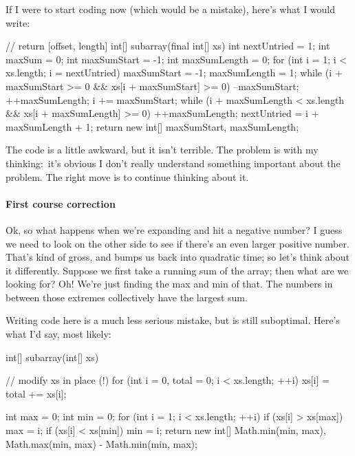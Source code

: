 \documentclass{article}
\begin{document}
        If I were to start coding now (which would be a mistake), here's what I
        would write:

\begin{javacode}
// return [offset, length]
int[] subarray(final int[] xs) {
  int nextUntried  = 1;
  int maxSum       = 0;
  int maxSumStart  = -1;
  int maxSumLength = 0;
  for (int i = 1; i < xs.length; i = nextUntried) {
    maxSumStart  = -1;
    maxSumLength = 1;
    while (i + maxSumStart >= 0 && xs[i + maxSumStart] >= 0) {
      --maxSumStart;
      ++maxSumLength;
    }
    i += maxSumStart;
    while (i + maxSumLength < xs.length
           && xs[i + maxSumLength] >= 0)
      ++maxSumLength;
    nextUntried = i + maxSumLength + 1;
  }
  return new int[] {maxSumStart, maxSumLength};
} \end{javacode}

        The code is a little awkward, but it isn't terrible. The problem is
        with my thinking:~it's obvious I don't really understand something
        important about the problem. The right move is to continue thinking
        about it.

\paragraph{First course correction}
        Ok, so what happens when we're expanding and hit a negative number? I
        guess we need to look on the other side to see if there's an even
        larger positive number. That's kind of gross, and bumps us back into
        quadratic time; so let's think about it differently. Suppose we first
        take a running sum of the array; then what are we looking for? Oh!
        We're just finding the max and min of that. The numbers in between
        those extremes collectively have the largest sum.

        Writing code here is a much less serious mistake, but is still
        suboptimal. Here's what I'd say, most likely:

\begin{javacode}
int[] subarray(int[] xs) {
  // modify xs in place (!)
  for (int i = 0, total = 0; i < xs.length; ++i)
    xs[i] = total += xs[i];

  int max = 0;
  int min = 0;
  for (int i = 1; i < xs.length; ++i) {
    if (xs[i] > xs[max]) max = i;
    if (xs[i] < xs[min]) min = i;
  }
  return new int[] {Math.min(min, max),
                    Math.max(min, max) - Math.min(min, max)};
} \end{javacode}
\end{document}
